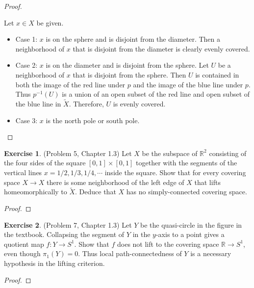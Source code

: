 \documentclass[12pt, psamsfonts]{amsart}
\theoremstyle{definition}
\newtheorem*{exer}{Exercise}
\theoremstyle{remark}
\numberwithin{equation}{section}
\begin{document}
\begin{proof}
\begin{itemize}
      Let $x \in X$ be given.
      \begin{itemize}
        \item
          Case 1: $x$ is on the sphere and is disjoint from the diameter.
          Then a neighborhood of $x$ that is disjoint from the diameter is clearly evenly covered.
        \item
          Case 2: $x$ is on the diameter and is disjoint from the sphere.
          Let $U$ be a neighborhood of $x$ that is disjoint from the sphere.
          Then $U$ is contained in both the image of the red line under $p$ and the image of the blue line under $p$.
          Thus $p^{-1}(U)$ is a union of an open subset of the red line and open subset of the blue line in $\tilde{X}$.
          Therefore, $U$ is evenly covered.
        \item
          Case 3: $x$ is the north pole or south pole.
      \end{itemize}
  \end{itemize}
\end{proof}

\begin{exer}{(Problem 5, Chapter 1.3)}
  Let $X$ be the subspace of $\mathbb{R}^2$ consisting of the four sides of the square $[0, 1] \times [0, 1]$ together with the segments of the vertical lines $x = 1/2, 1/3, 1/4, \cdots$ inside the square.
  Show that for every covering space $X \rightarrow X$ there is some neighborhood of the left edge of $X$ that lifts homeomorphically to $\tilde{X}$.
  Deduce that $X$ has no simply-connected covering space.
\end{exer}

\begin{proof}
\end{proof}

\begin{exer}{(Problem 7, Chapter 1.3)}
  Let $Y$ be the quasi-circle in the figure in the textbook.
  Collapsing the segment of $Y$ in the $y$-axis to a point gives a quotient map $f: Y \rightarrow S^1$.
  Show that $f$ does not lift to the covering space $\mathbb{R} \rightarrow S^1$, even though $\pi_1(Y) = 0$.
  Thus local path-connectedness of $Y$ is a necessary hypothesis in the lifting criterion.
\end{exer}

\begin{proof}
\end{proof}
\end{document}
